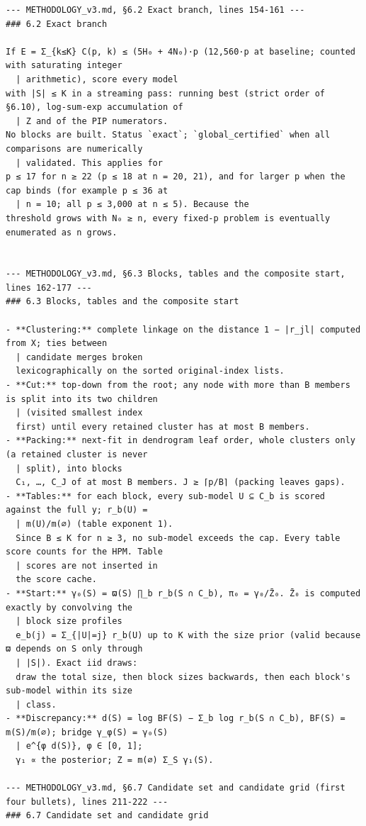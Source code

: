\documentclass[11pt]{report}
\begin{document}
\begin{Verbatim}[fontsize=\footnotesize,formatcom=\qfont]
--- METHODOLOGY_v3.md, §6.2 Exact branch, lines 154-161 ---
### 6.2 Exact branch

If E = Σ_{k≤K} C(p, k) ≤ (5H₀ + 4N₀)·p (12,560·p at baseline; counted with saturating integer
  | arithmetic), score every model
with |S| ≤ K in a streaming pass: running best (strict order of §6.10), log-sum-exp accumulation of
  | Z and of the PIP numerators.
No blocks are built. Status `exact`; `global_certified` when all comparisons are numerically
  | validated. This applies for
p ≤ 17 for n ≥ 22 (p ≤ 18 at n = 20, 21), and for larger p when the cap binds (for example p ≤ 36 at
  | n = 10; all p ≤ 3,000 at n ≤ 5). Because the
threshold grows with N₀ ≥ n, every fixed-p problem is eventually enumerated as n grows.


--- METHODOLOGY_v3.md, §6.3 Blocks, tables and the composite start, lines 162-177 ---
### 6.3 Blocks, tables and the composite start

- **Clustering:** complete linkage on the distance 1 − |r_jl| computed from X; ties between
  | candidate merges broken
  lexicographically on the sorted original-index lists.
- **Cut:** top-down from the root; any node with more than B members is split into its two children
  | (visited smallest index
  first) until every retained cluster has at most B members.
- **Packing:** next-fit in dendrogram leaf order, whole clusters only (a retained cluster is never
  | split), into blocks
  C₁, …, C_J of at most B members. J ≥ ⌈p/B⌉ (packing leaves gaps).
- **Tables:** for each block, every sub-model U ⊆ C_b is scored against the full y; r_b(U) =
  | m(U)/m(∅) (table exponent 1).
  Since B ≤ K for n ≥ 3, no sub-model exceeds the cap. Every table score counts for the HPM. Table
  | scores are not inserted in
  the score cache.
- **Start:** γ₀(S) = ϖ(S) ∏_b r_b(S ∩ C_b), π₀ = γ₀/Z̄₀. Z̄₀ is computed exactly by convolving the
  | block size profiles
  e_b(j) = Σ_{|U|=j} r_b(U) up to K with the size prior (valid because ϖ depends on S only through
  | |S|). Exact iid draws:
  draw the total size, then block sizes backwards, then each block's sub-model within its size
  | class.
- **Discrepancy:** d(S) = log BF(S) − Σ_b log r_b(S ∩ C_b), BF(S) = m(S)/m(∅); bridge γ_φ(S) = γ₀(S)
  | e^{φ d(S)}, φ ∈ [0, 1];
  γ₁ ∝ the posterior; Z = m(∅) Σ_S γ₁(S).

--- METHODOLOGY_v3.md, §6.7 Candidate set and candidate grid (first four bullets), lines 211-222 ---
### 6.7 Candidate set and candidate grid


\end{Verbatim}
\end{document}
